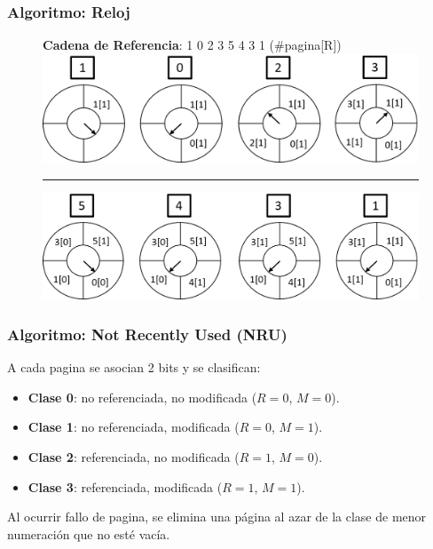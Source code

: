 \documentclass{beamer}
\newcommand{\algTitle}{\textbf{Algoritmo:} }
\begin{document}
\begin{frame}
	\frametitle{\algTitle Reloj}
	
	
	\begin{figure}[H]
		{\textbf{Cadena de Referencia}: 1 0 2 3 5 4 3 1 (\#pagina[R])} 
		\includegraphics[scale=0.45]{img/clock1.png}
		\\ \hrule
		\includegraphics[scale=0.45]{img/clock2.png}
	\end{figure}
\end{frame}


\begin{frame}
	\frametitle{\algTitle Not Recently Used (NRU)}
	
	A cada pagina se asocian 2 bits y se clasifican:
	\begin{itemize}
		\item \textbf{Clase 0}: no referenciada, no modificada ($R=0$, $M=0$).
		\item \textbf{Clase 1}: no referenciada, modificada ($R=0$, $M=1$).
		\item \textbf{Clase 2}: referenciada, no modificada ($R=1$, $M=0$).
		\item \textbf{Clase 3}: referenciada, modificada ($R=1$, $M=1$).
	\end{itemize}
	 Al ocurrir fallo de pagina, se elimina una página al azar de la clase de menor numeración que no esté vacía.

\end{frame}
\end{document}
